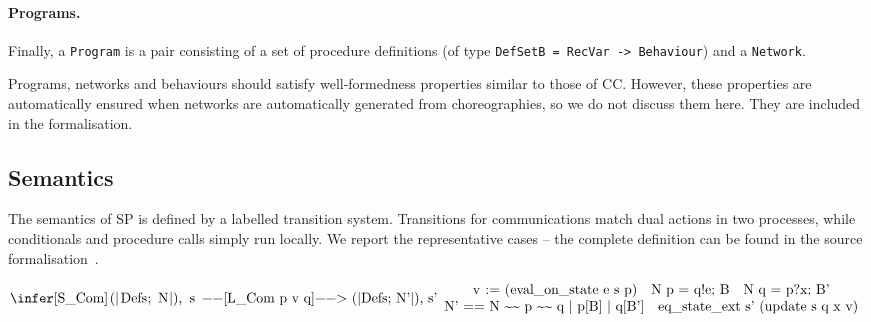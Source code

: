 \documentclass[runningheads]{llncs}
\begin{document}
\paragraph{Programs.}
Finally, a \lstinline+Program+ is a pair consisting of a set of procedure definitions (of type \lstinline+DefSetB = RecVar -> Behaviour+) and a \lstinline+Network+.

Programs, networks and behaviours should satisfy well-formedness properties similar to those of CC.
However, these properties are automatically ensured when networks are automatically generated from
choreographies, so we do not discuss them here.
They are included in the formalisation.


\subsection{Semantics}

The semantics of SP is defined by a labelled transition system.
Transitions for communications match dual actions in two processes, while conditionals and procedure
calls simply run locally.
We report the representative cases -- the complete definition can be found in the source formalisation~\cite{CMP21-source}.



\[
\infer[\mbox{\lstinline+S_Com+}]{
	\mbox{\lstinline+(|Defs; N|), s --[L_Com p v q]--> (|Defs; N'|), s'+}
}{
	\begin{array}{c}
	\mbox{\lstinline+v := (eval_on_state e s p)+}
	\quad
    \mbox{\lstinline+N p = q!e; B+}
    \quad
    \mbox{\lstinline+N q = p?x; B'+}
    \\
    \mbox{\lstinline+N' == N ~~ p ~~ q | p[B] | q[B']+}
    \quad
    \mbox{\lstinline+eq_state_ext s' (update s q x v)+}
    \end{array}
}
\]

\end{document}
